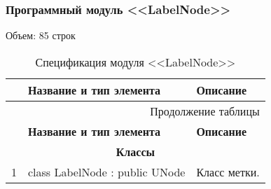 \subsubsection*{Программный модуль <<LabelNode>>}
Объем: 85 строк

\small
\singlespacing
\begin{longtable}[h]{|p{}|p{}|p{}|}
  \caption{Спецификация модуля <<LabelNode>>}
	\\ \hline
	  \textbf{\No}                  &
	  \textbf{Название и тип элемента}  &
	  \textbf{Описание}
	\\ \hline
  \endfirsthead

  \multicolumn{3}{r}{Продолжение таблицы \thetable{}}
  \\ \hline
	  \textbf{\No}                  &
	  \textbf{Название и тип элемента}  &
	  \textbf{Описание}
	\\ \hline
  \endhead

  \multicolumn{3}{|c|}{\textbf{Классы}} \\
  \hline
  1 & class LabelNode : public UNode & Класс метки. \\ \hline
\end{longtable}
\normalsize
\onehalfspacing


